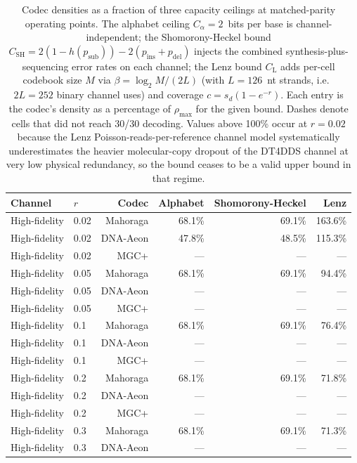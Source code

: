 \begin{table}[H]
\centering
\caption{Codec densities as a fraction of three capacity ceilings at matched-parity operating points. The alphabet ceiling $C_{\alpha}=2$~bits per base is channel-independent; the Shomorony-Heckel bound $C_{\mathrm{SH}}=2(1-h(p_{\mathrm{sub}}))-2(p_{\mathrm{ins}}+p_{\mathrm{del}})$ injects the combined synthesis-plus-sequencing error rates on each channel; the Lenz bound $C_{\mathrm{L}}$ adds per-cell codebook size $M$ via $\beta=\log_2 M / (2L)$ (with $L=126$~nt strands, i.e.\ $2L=252$ binary channel uses) and coverage $c=s_d(1-e^{-r})$. Each entry is the codec's density as a percentage of $\rho_{\max}$ for the given bound. Dashes denote cells that did not reach 30/30 decoding. Values above 100\% occur at $r=0.02$ because the Lenz Poisson-reads-per-reference channel model systematically underestimates the heavier molecular-copy dropout of the DT4DDS channel at very low physical redundancy, so the bound ceases to be a valid upper bound in that regime.}
\label{app:shannon_fraction_full}
\small
\setlength{\tabcolsep}{6pt}
\renewcommand{\arraystretch}{1.15}
\begin{tabular}{llrrrr}
\toprule
Channel & $r$ & Codec & Alphabet & Shomorony-Heckel & Lenz \\
\midrule
High-fidelity & 0.02 & Mahoraga & 68.1\% & 69.1\% & 163.6\% \\
High-fidelity & 0.02 & DNA-Aeon & 47.8\% & 48.5\% & 115.3\% \\
High-fidelity & 0.02 & MGC+ & --- & --- & --- \\
High-fidelity & 0.05 & Mahoraga & 68.1\% & 69.1\% & 94.4\% \\
High-fidelity & 0.05 & DNA-Aeon & --- & --- & --- \\
High-fidelity & 0.05 & MGC+ & --- & --- & --- \\
High-fidelity & 0.1 & Mahoraga & 68.1\% & 69.1\% & 76.4\% \\
High-fidelity & 0.1 & DNA-Aeon & --- & --- & --- \\
High-fidelity & 0.1 & MGC+ & --- & --- & --- \\
High-fidelity & 0.2 & Mahoraga & 68.1\% & 69.1\% & 71.8\% \\
High-fidelity & 0.2 & DNA-Aeon & --- & --- & --- \\
High-fidelity & 0.2 & MGC+ & --- & --- & --- \\
High-fidelity & 0.3 & Mahoraga & 68.1\% & 69.1\% & 71.3\% \\
High-fidelity & 0.3 & DNA-Aeon & --- & --- & --- \\

\end{tabular}
\end{table}
